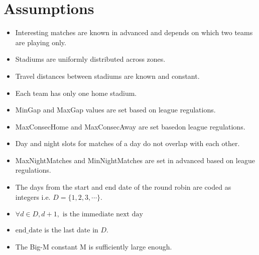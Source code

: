 \documentclass[a4paper, 12pt]{article}
\begin{document}
\section*{Assumptions}
\begin{itemize}
    \item Interesting matches are known in advanced and depends on which two teams are playing only.
    \item Stadiums are uniformly distributed across zones.
    \item Travel distances between stadiums are known and constant.
    \item Each team has only one home stadium.
    \item MinGap and MaxGap values are set based on league regulations.
    \item MaxConsecHome and MaxConsecAway are set basedon league regulations.
    \item Day and night slots for matches of a day do not overlap with each other.
    \item MaxNightMatches and MinNightMatches are set in advanced based on league regulations.
    \item The days from the start and end date of the round robin are coded as integers i.e. $D = \{1,2,3, \cdots \}$.
    \item $\forall d \in D, d+1, \text{ is the immediate next day}$ 
    \item $\text{end\_date}$ is the last date in $D$.
    \item The Big-M constant M is sufficiently large enough.
\end{itemize}




\end{document}
